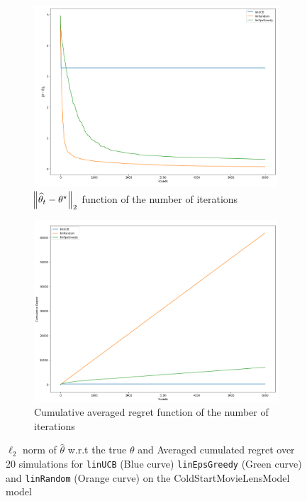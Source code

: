 \documentclass[11pt]{article}
\numberwithin{figure}{section} %
\begin{document}
\begin{figure}[H]
    \centering
    \begin{subfigure}{.5\textwidth}
        \centering
        \includegraphics[width=1\linewidth]{images/linUCB_theta}
        \caption{$\norm{\widehat{\theta}_t - \theta^{\star}}_2$ function of the number of iterations}
        \label{fig:lin_theta}
    \end{subfigure}%
    \begin{subfigure}{.5\textwidth}
        \centering
        \includegraphics[width=1\linewidth]{images/linUCB_regret}
        \caption{Cumulative averaged regret function of the number of iterations}
        \label{fig:lin_regret}
    \end{subfigure}
		\caption{$\ell_2$ norm of $\widehat{\theta}$ w.r.t the true $\theta$ and Averaged cumulated regret over 20 simulations for \texttt{linUCB} (Blue curve) \texttt{linEpsGreedy} (Green curve) and \texttt{linRandom} (Orange curve) on the ColdStartMovieLensModel model}
\label{fig:lin_graphs}
\end{figure}
\end{document}

